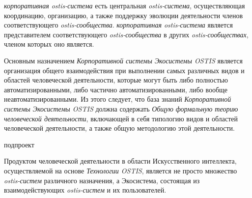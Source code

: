 \textit{корпоративная ostis-система} есть центральная \textit{ostis-система}, осуществляющая координацию, организацию, а также поддержку эволюции деятельности членов соответствующего \textit{ostis-сообщества}. 
\textit{корпоративная ostis-система} является представителем соответствующего \textit{ostis-сообщества} в других \textit{ostis-сообществах}, членом которых оно является.


Основным назначением \textit{Корпоративной системы Экосистемы OSTIS} является организация общего взаимодействия при выполнении самых различных видов и областей человеческой деятельности, которые могут быть либо полностью автоматизированными, либо частично автоматизированными, либо вообще неавтоматизированными. 
Из этого следует, что база знаний \textit{Корпоративной системы Экосистемы OSTIS} должна содержать \textit{Общую формальную теорию человеческой деятельности}, включающей в себя типологию видов и областей человеческой деятельности, а также общую методологию этой деятельности.

\begin{SCn}
\begin{scnrelfromlist}{подпроект}
\end{scnrelfromlist}
\end{SCn}

Продуктом человеческой деятельности в области Искусственного интеллекта, осуществляемой на основе \textit{Технологии OSTIS}, является не просто множество \textit{ostis-систем} различного назначения, а Экосистема, состоящая из взаимодействующих \textit{ostis-систем} и их пользователей. 

